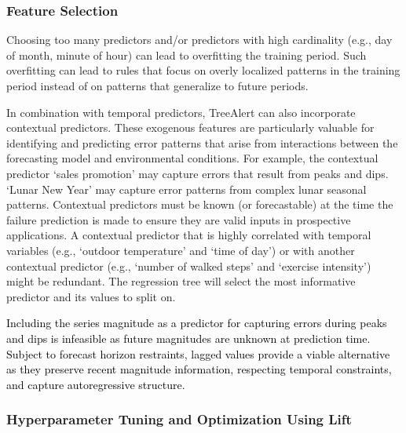 \documentclass[12pt]{article}
\newcommand{\matt}[1]{\textcolor{black}{#1}}
\begin{document}
\subsubsection{Feature Selection}
Choosing too many predictors and/or predictors with high cardinality (e.g., day of month, minute of hour) can lead to overfitting the training period. Such overfitting can lead to rules that focus on overly localized patterns in the training period instead of on patterns that generalize to future periods. 

In combination with temporal predictors, TreeAlert can also incorporate contextual predictors. These exogenous features are particularly valuable for identifying and predicting error patterns that arise from interactions between the forecasting model and environmental conditions. For example, the contextual predictor ‘sales promotion’ may capture errors that result from peaks and dips. `Lunar New Year' may capture error patterns from complex lunar seasonal patterns. Contextual predictors must be known (or forecastable) at the time the failure prediction is made to ensure they are valid inputs in prospective applications. A contextual predictor that is highly correlated with temporal variables (e.g., `outdoor temperature' and `time of day') or with another contextual predictor (e.g., `number of walked steps' and `exercise intensity') might be redundant. The regression tree will select the most informative predictor and its values to split on.

\matt{Including the series magnitude as a predictor for capturing errors during peaks and dips is infeasible as future magnitudes are unknown at prediction time. Subject to forecast horizon restraints, lagged values provide a viable alternative as they preserve recent magnitude information, respecting temporal constraints, and capture autoregressive structure.}


\subsubsection{Hyperparameter Tuning and Optimization Using Lift}
\label{sec:tuning_optimization}
\end{document}
